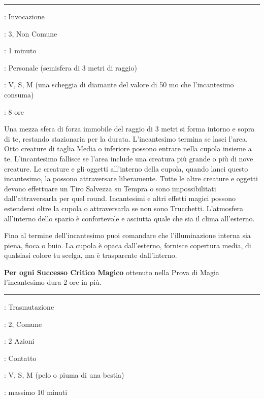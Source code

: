 \begin{multicols}{2}
\smallskip\noindent\rule{\linewidth}{2pt} \hypertarget{Capanna}{}\smallskip{}
\noindent
\begin{description}[noitemsep, topsep=0pt, parsep=0pt, partopsep=0pt, leftmargin=0cm, labelwidth=2.8cm]
	\item[\textbf{Lista di Magia}]: Invocazione
	\item[\textbf{Livello}]: 3, Non Comune
	\item[\textbf{T. di Lancio}]: 1 minuto
	\item[\textbf{Gittata}]: Personale (semisfera di 3 metri di raggio)
	\item[\textbf{Componenti}]: V, S, M (una scheggia di diamante del valore di 50 mo che l'incantesimo consuma)
	\item[\textbf{Durata}]: 8 ore
\end{description}

Una mezza sfera di forza immobile del raggio di 3 metri si forma intorno e sopra di te, restando stazionaria per la durata. L'incantesimo termina se lasci l'area. Otto creature di taglia Media o inferiore possono entrare nella cupola insieme a te. L'incantesimo fallisce se l'area include una creatura più grande o più di nove creature. Le creature e gli oggetti all'interno della cupola, quando lanci questo incantesimo, la possono attraversare liberamente. Tutte le altre creature e oggetti devono effettuare un Tiro Salvezza su Tempra o sono impossibilitati dall'attraversarla per quel round. Incantesimi e altri effetti magici possono estendersi oltre la cupola o attraversarla se non sono Trucchetti. L'atmosfera all'interno dello spazio è confortevole e asciutta quale che sia il clima all'esterno.

Fino al termine dell'incantesimo puoi comandare che l'illuminazione interna sia piena, fioca o buio. La cupola è opaca dall'esterno, fornisce copertura media, di qualsiasi colore tu scelga, ma è trasparente dall'interno.

\textbf{Per ogni Successo Critico Magico} ottenuto nella Prova di Magia l'incantesimo dura 2 ore in più.

\smallskip\noindent\rule{\linewidth}{2pt} \hypertarget{Caratteristica Potenziata}{}\smallskip{}
\noindent
\begin{description}[noitemsep, topsep=0pt, parsep=0pt, partopsep=0pt, leftmargin=0cm, labelwidth=2.8cm]
	\item[\textbf{Lista di Magia}]: Trasmutazione
	\item[\textbf{Livello}]: 2, Comune
	\item[\textbf{T. di Lancio}]: 2 Azioni
	\item[\textbf{Gittata}]: Contatto
	\item[\textbf{Componenti}]: V, S, M (pelo o piuma di una bestia)
	\item[\textbf{Durata}]: massimo 10 minuti
\end{description}


\end{multicols}
